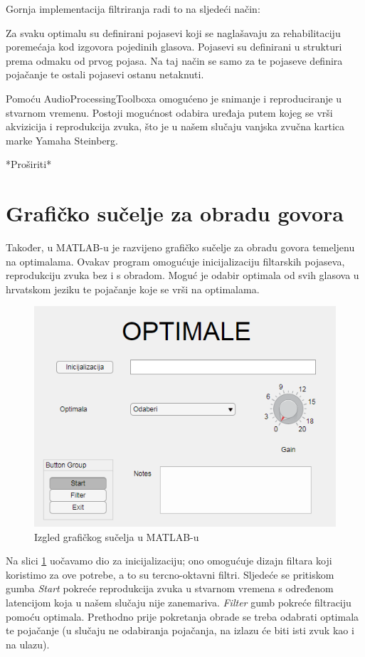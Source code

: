 \documentclass[times, utf8, diplomski]{fer}
\begin{document}
Gornja implementacija filtriranja radi to na sljedeći način:

Za svaku optimalu su definirani pojasevi koji se naglašavaju za rehabilitaciju poremećaja kod izgovora pojedinih glasova. Pojasevi su definirani u strukturi prema odmaku od prvog pojasa. Na taj način se samo za te pojaseve definira pojačanje te ostali pojasevi ostanu netaknuti.


Pomoću AudioProcessingToolboxa omogućeno je snimanje i reproduciranje u stvarnom vremenu. Postoji mogućnost odabira uređaja putem kojeg se vrši akvizicija i reprodukcija zvuka, što je u našem slučaju vanjska zvučna kartica marke Yamaha Steinberg.

*Proširiti*

\section{Grafičko sučelje za obradu govora}

Također, u MATLAB-u je razvijeno grafičko sučelje za obradu govora temeljenu na optimalama. Ovakav program omogućuje inicijalizaciju filtarskih pojaseva, reprodukciju zvuka bez i s obradom. Moguć je odabir optimala od svih glasova u hrvatskom jeziku te pojačanje koje se vrši na optimalama.

\begin{figure}[hbt!]
 \centering
 \includegraphics[scale=0.5]{photos/gui.png}
 \caption{Izgled grafičkog sučelja u MATLAB-u}
 \label{gui}
\end{figure}

Na slici \ref{gui} uočavamo dio za inicijalizaciju; ono omogućuje dizajn filtara koji koristimo za ove potrebe, a to su tercno-oktavni filtri. Sljedeće se pritiskom gumba \textit{Start} pokreće reprodukcija zvuka u stvarnom vremena s određenom latencijom koja u našem slučaju nije zanemariva. \textit{Filter} gumb pokreće filtraciju pomoću optimala. Prethodno prije pokretanja obrade se treba odabrati optimala te pojačanje (u slučaju ne odabiranja pojačanja, na izlazu će biti isti zvuk kao i na ulazu). 
\end{document}
